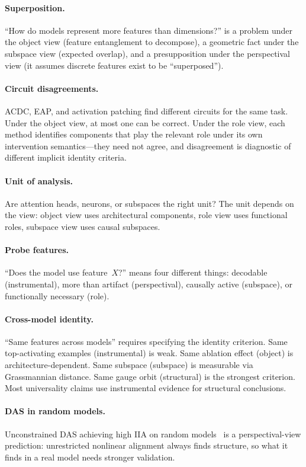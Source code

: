 \documentclass[11pt]{article}
\theoremstyle{remark}
\begin{document}
\paragraph{Superposition.}
``How do models represent more features than dimensions?'' is a
problem under the object view (feature entanglement to decompose), a
geometric fact under the subspace view (expected overlap), and a
presupposition under the perspectival view (it assumes discrete
features exist to be ``superposed'').

\paragraph{Circuit disagreements.}
ACDC, EAP, and activation patching find different circuits for the same
task.  Under the object view, at most one can be correct.  Under the
role view, each method identifies components that play the relevant
role under its own intervention semantics---they need not agree, and
disagreement is diagnostic of different implicit identity criteria.

\paragraph{Unit of analysis.}
Are attention heads, neurons, or subspaces the right unit?  The unit
depends on the view: object view uses architectural components, role
view uses functional roles, subspace view uses causal subspaces.

\paragraph{Probe features.}
``Does the model use feature~$X$?'' means four different things:
decodable (instrumental), more than artifact (perspectival), causally
active (subspace), or functionally necessary (role).

\paragraph{Cross-model identity.}
``Same features across models'' requires specifying the identity
criterion.  Same top-activating examples (instrumental) is weak.
Same ablation effect (object) is architecture-dependent.  Same
subspace (subspace) is measurable via Grassmannian distance.  Same
gauge orbit (structural) is the strongest criterion.  Most
universality claims use instrumental evidence for structural
conclusions.

\paragraph{DAS in random models.}
Unconstrained DAS achieving high IIA on random
models~\citep{sutter2025} is a perspectival-view prediction:
unrestricted nonlinear alignment always finds structure, so
what it finds in a real model needs stronger validation.
\end{document}
